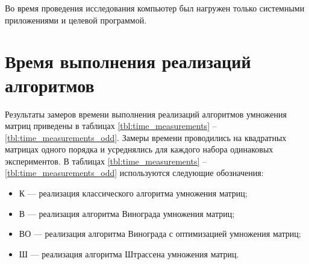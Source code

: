 Во время проведения исследования компьютер был нагружен только системными приложениями и целевой программой.

\section{Время выполнения реализаций алгоритмов}

Результаты замеров времени выполнения реализаций алгоритмов умножения матриц приведены в таблицах \ref{tbl:time_measurements} -- \ref{tbl:time_measurements_odd}.
Замеры времени проводились на квадратных матрицах одного порядка и усреднялись для каждого набора одинаковых экспериментов.
В таблицах \ref{tbl:time_measurements} -- \ref{tbl:time_measurements_odd} используются следующие обозначения: 
\begin{itemize}
	\item К --- реализация классического алгоритма умножения матриц;
	\item В --- реализация алгоритма Винограда умножения матриц;
	\item ВО --- реализация алгоритма Винограда с оптимизацией умножения матриц;
	\item Ш --- реализация алгоритма Штрассена умножения матриц.
\end{itemize}


